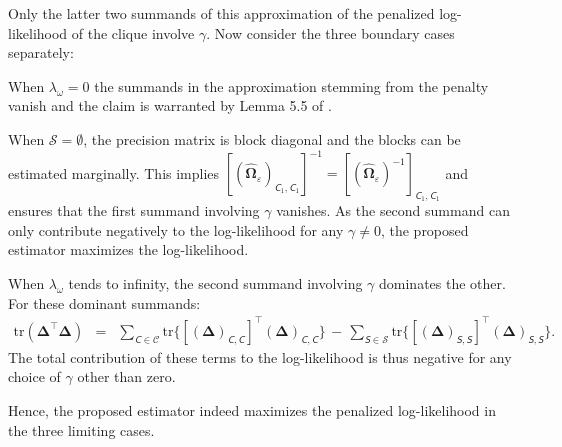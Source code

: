 \documentclass[a4paper]{article}
\begin{document}
Only the latter two summands of this approximation of the penalized log-likelihood of the clique involve $\gamma$. Now consider the three boundary cases separately:
\begin{compactitem}
\item When $\lambda_{\omega} = 0$ the summands in the approximation stemming from the penalty vanish and the claim is warranted by Lemma 5.5 of \cite{Laur1996}.

\item When $\mathcal{S} = \emptyset$, the precision matrix is block diagonal and the blocks can be estimated marginally. This implies $[(\widehat{\mathbf{\Omega}}_{\varepsilon})_{\mathsfit{C}_1,\mathsfit{C}_1} ]^{-1} =
[(\widehat{\mathbf{\Omega}}_{\varepsilon})^{-1}]_{\mathsfit{C}_1,\mathsfit{C}_1}$ and ensures that the first summand involving $\gamma$ vanishes. As the second summand can only contribute negatively to the log-likelihood for any $\gamma \not= 0$, the proposed estimator maximizes the log-likelihood.

\item When $\lambda_{\omega}$ tends to infinity, the second summand involving $\gamma$ dominates the other. For these dominant summands:
\begin{eqnarray*}
\mbox{tr}  ( \mathbf{\Delta}^\top \mathbf{\Delta})
& = & \sum_{\mathsfit{C} \in \mathcal{C}} \mbox{tr} \{ [ (\mathbf{\Delta})_{\mathsfit{C},\mathsfit{C}}]^{\top} (\mathbf{\Delta})_{\mathsfit{C},\mathsfit{C}} \}
\, - \, \sum_{\mathsfit{S} \in \mathcal{S}} \mbox{tr} \{ [ (\mathbf{\Delta})_{\mathsfit{S},\mathsfit{S}}]^{\top} (\mathbf{\Delta})_{\mathsfit{S}, \mathsfit{S}} \}.
\end{eqnarray*}
The total contribution of these terms to the log-likelihood is thus negative for any choice of $\gamma$ other than zero.

\end{compactitem}
Hence, the proposed estimator indeed maximizes the penalized log-likelihood in the three limiting cases.

\newpage
\end{document}
